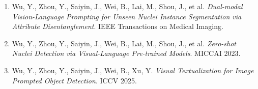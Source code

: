 \achievement

\begin{enumerate}[label=(\arabic*)]
  \item Wu, Y., Zhou, Y., Saiyin, J., Wei, B., Lai, M., Shou, J., et al. \emph{Dual-modal Vision-Language Prompting for Unseen Nuclei Instance Segmentation via Attribute Disentanglement}. IEEE Transactions on Medical Imaging.
  \item Wu, Y., Zhou, Y., Saiyin, J., Wei, B., Lai, M., Shou, J., et al. \emph{Zero-shot Nuclei Detection via Visual-Language Pre-trained Models}. MICCAI 2023.
  \item Wu, Y., Zhou, Y., Saiyin, J., Wei, B., Xu, Y. \emph{Visual Textualization for Image Prompted Object Detection}. ICCV 2025.

\end{enumerate}
